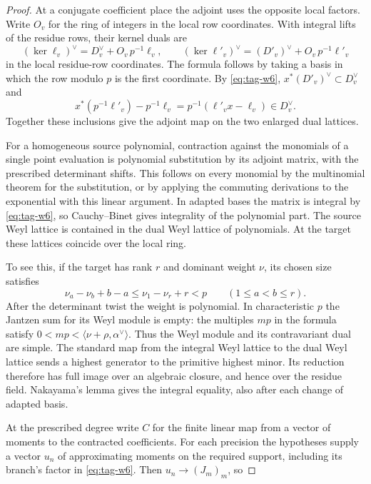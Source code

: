 \begin{proof}
At a conjugate coefficient place the adjoint uses the opposite
local factors. Write \(O_v\) for the ring of integers in the local row
coordinates. With integral lifts of the residue rows, their kernel duals are
\[
 (\ker\ell_v)^\vee=D_v^\vee+O_v\,p^{-1}\ell_v,\qquad
 (\ker\ell'_v)^\vee=(D'_v)^\vee+O_v\,p^{-1}\ell'_v
\]
in the local residue-row coordinates. The formula follows by
taking a basis in which the row modulo \(p\) is the first
coordinate. By \eqref{eq:tag-w6}, \(x^*(D'_v)^\vee\subset D_v^\vee\) and
\[
 x^*(p^{-1}\ell'_v)-p^{-1}\ell_v
    =p^{-1}(\ell'_v x-\ell_v)\in D_v^\vee .
\]
Together these inclusions give the adjoint map on the two
enlarged dual lattices.

For a homogeneous source polynomial, contraction against the
monomials of a single point evaluation is polynomial substitution
by its adjoint matrix, with the prescribed determinant shifts.
This follows on every monomial by the multinomial theorem for
the substitution, or by applying the commuting derivations to
the exponential with this linear argument. In adapted bases the
matrix is integral by \eqref{eq:tag-w6}, so Cauchy--Binet gives integrality
of the polynomial part. The source Weyl lattice is contained in
the dual Weyl lattice of polynomials. At the target these lattices
coincide over the local ring.

To see this, if the target has rank
\(r\) and dominant weight \(\nu\), its chosen size satisfies
\[
     \nu_a-\nu_b+b-a\le \nu_1-\nu_r+r < p
                    \qquad (1\le a<b\le r).
\]
After the determinant twist the weight is polynomial. In
characteristic \(p\) the Jantzen sum for its Weyl module is
empty: the multiples \(mp\) in the formula satisfy
\(0<mp<\langle\nu+\rho,\alpha^\vee\rangle\).
Thus the Weyl module and its contravariant dual are simple.
The standard map from the integral Weyl lattice to the dual
Weyl lattice sends a highest generator to the primitive highest
minor. Its reduction therefore has full image over an algebraic
closure, and hence over the residue field. Nakayama's lemma gives
the integral equality, also after each change of adapted basis.
\cite{jantzen-rep}\label{cor:word-moments-1}

At the prescribed degree write \(C\) for the finite linear
map from a vector of moments to the contracted coefficients.
For each precision the hypotheses supply a vector \(u_n\) of
approximating moments on the required support, including its
branch's factor in \eqref{eq:tag-w6}. Then \(u_n\to (J_m)_m\), so


\end{proof}
